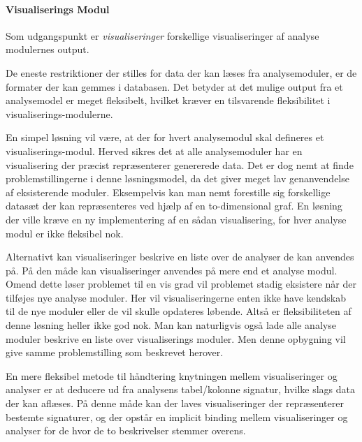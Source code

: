 \paragraph{Visualiserings Modul}\label{sec:visningsmodul}
Som udgangspunkt er \textit{visualiseringer} forskellige visualiseringer af analyse modulernes output.

De eneste restriktioner der stilles for data der kan læses fra analysemoduler, er de formater der kan gemmes i databasen.
Det betyder at det mulige output fra et analysemodel er meget fleksibelt, hvilket kræver en tilsvarende fleksibilitet i visualiserings-modulerne.

En simpel løsning vil være, at der for hvert analysemodul skal defineres et visualiserings-modul.
Herved sikres det at alle analysemoduler har en visualisering der præcist repræsenterer genererede data.
Det er dog nemt at finde problemstillingerne i denne løsningsmodel, da det giver meget lav genanvendelse af eksisterende moduler.
Eksempelvis kan man nemt forestille sig forskellige datasæt der kan repræsenteres ved hjælp af en to-dimensional graf.
En løsning der ville kræve en ny implementering af en sådan visualisering, for hver analyse modul er ikke fleksibel nok.

Alternativt kan visualiseringer beskrive en liste over de analyser de kan anvendes på.
På den måde kan visualiseringer anvendes på mere end et analyse modul.
Omend dette løser problemet til en vis grad vil problemet stadig eksistere når der tilføjes nye analyse moduler.
Her vil visualiseringerne enten ikke have kendskab til de nye moduler eller de vil skulle opdateres løbende.
Altså er fleksibiliteten af denne løsning heller ikke god nok.
Man kan naturligvis også lade alle analyse moduler beskrive en liste over visualiserings moduler.
Men denne opbygning vil give samme problemstilling som beskrevet herover.

En mere fleksibel metode til håndtering knytningen mellem visualiseringer og analyser er at deducere ud fra analysens tabel/kolonne signatur, hvilke slags data der kan aflæses.
På denne måde kan der laves visualiseringer der repræsenterer bestemte signaturer, og der opstår en implicit binding mellem visualiseringer og analyser for de hvor de to beskrivelser stemmer overens.


